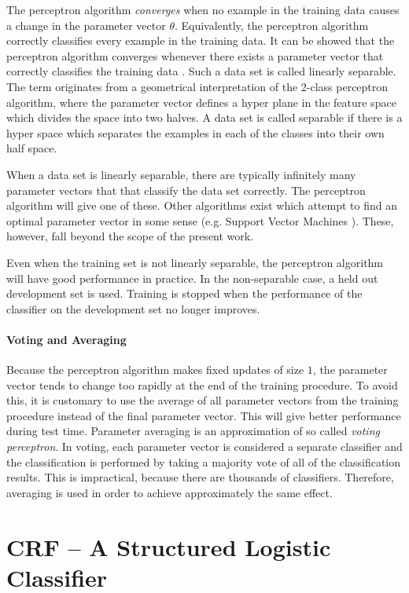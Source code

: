 The perceptron algorithm {\it converges} when no example in the
training data causes a change in the parameter vector
$\theta$. Equivalently, the perceptron algorithm correctly classifies
every example in the training data. It can be showed that the
perceptron algorithm converges whenever there exists a parameter vector
that correctly classifies the training data \citep{Freund1999}. Such a
data set is called linearly separable. The term originates from a
geometrical interpretation of the 2-class perceptron algorithm, where
the parameter vector defines a hyper plane in the feature space which
divides the space into two halves. A data set is called separable if
there is a hyper space which separates the examples in each of the
classes into their own half space.

When a data set is linearly separable, there are typically infinitely
many parameter vectors that that classify the data set correctly. The
perceptron algorithm will give one of these. Other algorithms exist
which attempt to find an optimal parameter vector in some sense
(e.g. Support Vector Machines \citep{Cortes1995}). These, however,
fall beyond the scope of the present work.

Even when the training set is not linearly separable, the perceptron
algorithm will have good performance in practice. In the non-separable
case, a held out development set is used. Training is stopped when the
performance of the classifier on the development set no longer
improves.

\paragraph{Voting and Averaging} Because the perceptron algorithm
makes fixed updates of size $1$, the parameter vector tends to change
too rapidly at the end of the training procedure. To avoid this, it is
customary to use the average of all parameter vectors from the
training procedure instead of the final parameter vector. This will
give better performance during test time. Parameter averaging is an
approximation of so called {\it voting perceptron}. In voting, each
parameter vector is considered a separate classifier and the
classification is performed by taking a majority vote of all of the
classification results. This is impractical, because there are
thousands of classifiers. Therefore, averaging is used in order to
achieve approximately the same effect.%

\section{CRF -- A Structured Logistic Classifier}

